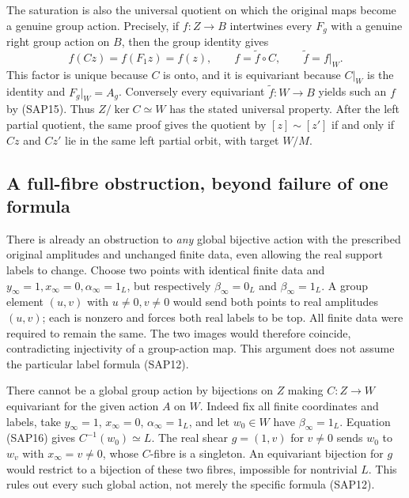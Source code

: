 The saturation is also the universal quotient on which the
original maps become a genuine group action. Precisely, if
$f:Z\to B$ intertwines every $F_g$ with a genuine right group
action on $B$, then the group identity gives
\begin{equation}\tag{SAP20a}
f(Cz)=f(F_1z)=f(z),\qquad
f=\widetilde f\circ C,\qquad \widetilde f=f|_W.
\end{equation}
This factor is unique because $C$ is onto, and it is equivariant
because $C|_W$ is the identity and $F_g|_W=A_g$.
Conversely every equivariant $\widetilde f:W\to B$ yields
such an $f$ by (SAP15). Thus $Z/\ker C\simeq W$ has the
stated universal property. After the left partial quotient,
the same proof gives the quotient by
$[z]\sim[z']$ if and only if $Cz$ and $Cz'$ lie in the same
left partial orbit, with target $W/M$.

\subsection{A full-fibre obstruction, beyond failure of one formula}

There is already an obstruction to \emph{any} global bijective
action with the prescribed original amplitudes and unchanged
finite data, even allowing the real support labels to change.
Choose two points with identical finite data and
$y_\infty=1,x_\infty=0,\alpha_\infty=1_L$, but respectively
$\beta_\infty=0_L$ and $\beta_\infty=1_L$. A group element
$(u,v)$ with $u\ne0,v\ne0$ would send both points to real
amplitudes $(u,v)$; each is nonzero and forces both real labels
to be top. All finite data were required to remain the same.
The two images would therefore coincide, contradicting
injectivity of a group-action map. This argument does not
assume the particular label formula (SAP12).

There cannot be a global group action by bijections on $Z$ making
$C:Z\to W$ equivariant for the given action $A$ on $W$.
Indeed fix all finite coordinates and labels, take
$y_\infty=1$, $x_\infty=0$, $\alpha_\infty=1_L$, and let
$w_0\in W$ have $\beta_\infty=1_L$. Equation (SAP16) gives
$C^{-1}(w_0)\simeq L$. The real shear $g=(1,v)$ for $v\ne0$
sends $w_0$ to $w_v$ with $x_\infty=v\ne0$, whose $C$-fibre
is a singleton. An equivariant bijection for $g$ would restrict
to a bijection of these two fibres, impossible for nontrivial $L$.
This rules out every such global action, not merely the specific
formula (SAP12).

